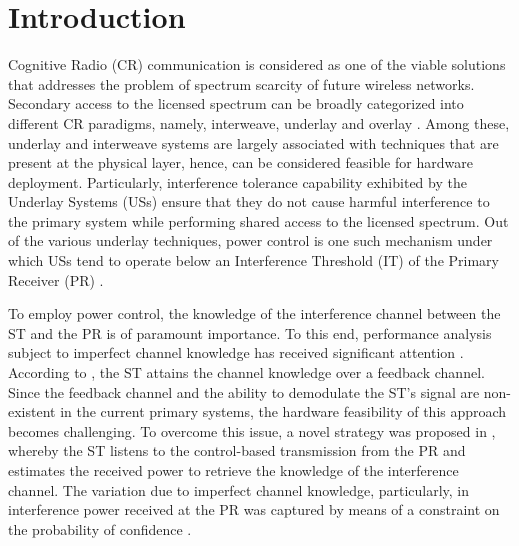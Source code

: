 \documentclass[letterpaper, twocolumn]{IEEEtran}
\begin{document}
\section{Introduction}%
Cognitive Radio (CR) communication is considered as one of the viable solutions that addresses the problem of spectrum scarcity of future wireless networks. Secondary access to the licensed spectrum can be broadly categorized into different CR paradigms, namely, interweave, underlay and overlay \cite{Goldsmith09}. Among these, underlay and interweave systems are largely associated with techniques that are present at the physical layer, hence, can be considered feasible for hardware deployment. %
Particularly, interference tolerance capability exhibited by the Underlay Systems (USs) ensure that they do not cause harmful interference to the primary system while performing shared access to the licensed spectrum. Out of the various underlay techniques, power control is one such mechanism under which USs tend to operate below an Interference Threshold (IT) of the Primary Receiver (PR) \cite{Xing07}. 


To employ power control, the knowledge of the interference channel between the ST and the PR is of paramount importance. To this end, performance analysis subject to imperfect channel knowledge has received significant attention \cite{Sharma15, Suraweera10, Kim12, Kaushik15}. According to \cite{Suraweera10, Kim12}, the ST attains the channel knowledge over a feedback channel. Since the feedback channel and the ability to demodulate the ST's signal are non-existent in the current primary systems, the hardware feasibility of this approach becomes challenging. To overcome this issue, a novel strategy was proposed in \cite{Kaushik15}, whereby the ST listens to the control-based transmission from the PR and estimates the received power to retrieve the knowledge of the interference channel. The variation due to imperfect channel knowledge, particularly, in interference power received at the PR was captured by means of a constraint on the probability of confidence \cite{Kaushik15}. 
\end{document}
